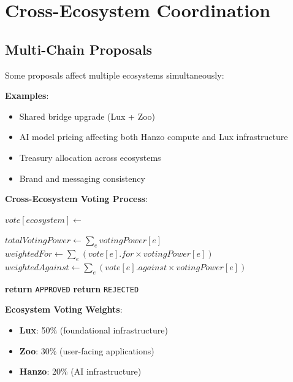 \section{Cross-Ecosystem Coordination}


\subsection{Multi-Chain Proposals}

Some proposals affect multiple ecosystems simultaneously:

\textbf{Examples}:
\begin{itemize}
\item Shared bridge upgrade (Lux + Zoo)
\item AI model pricing affecting both Hanzo compute and Lux infrastructure
\item Treasury allocation across ecosystems
\item Brand and messaging consistency
\end{itemize}

\textbf{Cross-Ecosystem Voting Process}:

\begin{algorithm}[H]
\caption{Cross-Ecosystem Proposal Voting}
\begin{algorithmic}[1]
        \State $vote[ecosystem] \gets$ 
    \EndFor

    \State $totalVotingPower \gets \sum_{e} votingPower[e]$
    \State $weightedFor \gets \sum_{e} (vote[e].for \times votingPower[e])$
    \State $weightedAgainst \gets \sum_{e} (vote[e].against \times votingPower[e])$

        \State \textbf{return} \texttt{APPROVED}
    \Else
        \State \textbf{return} \texttt{REJECTED}
    \EndIf
\EndFunction
\end{algorithmic}
\end{algorithm}

\textbf{Ecosystem Voting Weights}:
\begin{itemize}
\item \textbf{Lux}: 50\% (foundational infrastructure)
\item \textbf{Zoo}: 30\% (user-facing applications)
\item \textbf{Hanzo}: 20\% (AI infrastructure)
\end{itemize}

